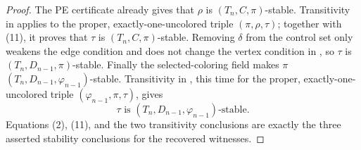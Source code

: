 \begin{proof}
The PE certificate already gives that \(\rho\) is
\((T_n,C,\pi)\)-stable.  Transitivity in  applies to the
proper, exactly-one-uncolored triple \((\pi,\rho,\tau)\); together with
(11), it proves that \(\tau\) is \((T_n,C,\pi)\)-stable.  Removing
\(\delta\) from the control set only weakens the edge condition and does
not change the vertex condition in , so \(\tau\)
is \((T_n,D_{n-1},\pi)\)-stable.  Finally the selected-coloring field
makes \(\pi\) \((T_n,D_{n-1},\varphi_{n-1})\)-stable.  Transitivity in
, this time for the proper, exactly-one-uncolored triple
\((\varphi_{n-1},\pi,\tau)\), gives
\[
 \tau\text{ is }(T_n,D_{n-1},\varphi_{n-1})\text{-stable}.
\]
Equations (2), (11), and the two transitivity conclusions are exactly the
three asserted stability conclusions for the recovered witnesses.
\end{proof}
